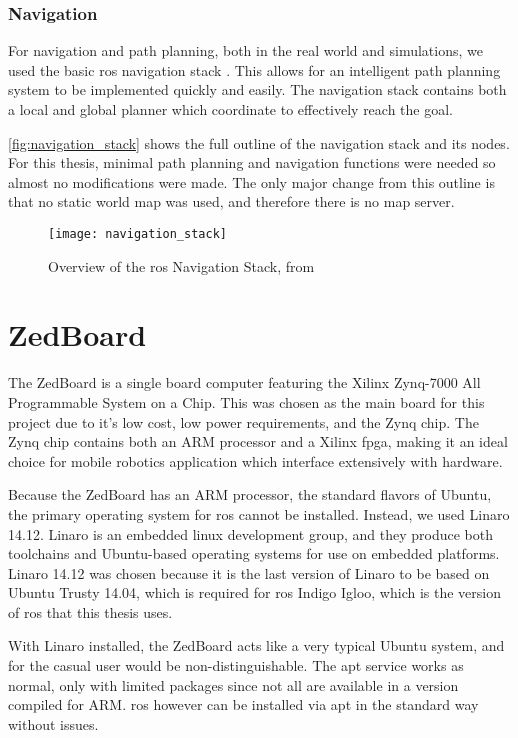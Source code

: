 \documentclass[thesis.tex]{subfile}
\begin{document}
\subsubsection{Navigation}
For navigation and path planning, both in the real world and simulations, we used the basic \gls{ros} navigation stack \cite{ros_navigation}. This allows for an intelligent path planning system to be implemented quickly and easily. The navigation stack contains both a local and global planner which coordinate to effectively reach the goal. 

\autoref{fig:navigation_stack} shows the full outline of the navigation stack and its nodes. For this thesis, minimal path planning and navigation functions were needed so almost no modifications were made. The only major change from this outline is that no static world map was used, and therefore there is no map server.

\begin{figure}
\texttt{[image: navigation\_stack]}
\caption[test]{Overview of the \gls{ros} Navigation Stack, from~\cite{NavigationStack}}
\label{fig:navigation_stack}
\end{figure}

\section{ZedBoard}
The ZedBoard is a single board computer featuring the Xilinx Zynq-7000 All Programmable System on a Chip. This was chosen as the main board for this project due to it's low cost, low power requirements, and the Zynq chip. The Zynq chip contains both an ARM processor and a Xilinx \gls{fpga}, making it an ideal choice for mobile robotics application which interface extensively with hardware.
 
Because the ZedBoard has an ARM processor, the standard flavors of Ubuntu, the primary operating system for \gls{ros} cannot be installed. Instead, we used Linaro 14.12. Linaro is an embedded linux development group, and they produce both toolchains and Ubuntu-based operating systems for use on embedded platforms. Linaro 14.12 was chosen because it is the last version of Linaro to be based on Ubuntu Trusty 14.04, which is required for \gls{ros} Indigo Igloo, which is the version of \gls{ros} that this thesis uses.

With Linaro installed, the ZedBoard acts like a very typical Ubuntu system, and for the casual user would be non-distinguishable. The apt service works as normal, only with limited packages since not all are available in a version compiled for ARM. \gls{ros} however can be installed via apt in the standard way without issues.
\end{document}
